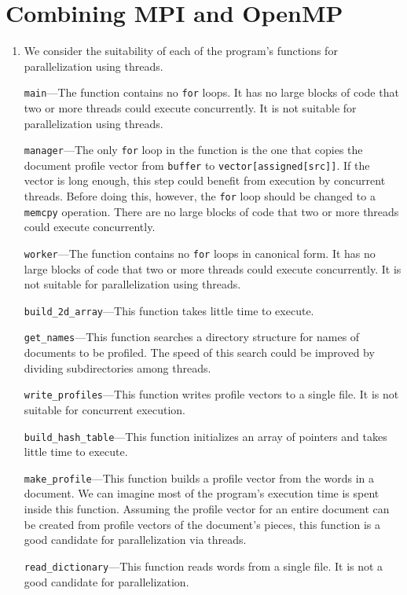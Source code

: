\chapter{Combining MPI and OpenMP}

\begin{enumerate}
\item 

We consider the suitability of each of the program's functions for
parallelization using threads.

{\tt main}---The function contains no {\tt for} loops.
It has no large blocks of code that
two or more threads could execute concurrently. It is not suitable for
parallelization using threads.

{\tt manager}---The only {\tt for} loop in the function is the one that
copies the document profile vector from {\tt buffer} to
{\tt vector[assigned[src]]}. If the vector is long enough, this step could
benefit from execution by concurrent threads. Before doing this,
however, the {\tt for} loop should be changed to a {\tt memcpy} operation.
There are no large blocks of code that two or more threads could execute
concurrently.

{\tt worker}---The function contains no {\tt for} loops in canonical form.
It has no large blocks of code that two or more threads could execute
concurrently. It is not suitable for parallelization using threads.

{\tt build\_2d\_array}---This function takes little time to execute.

{\tt get\_names}---This function searches a directory structure for names
of documents to be profiled. The speed of this search could be improved by
dividing subdirectories among threads.

{\tt write\_profiles}---This function writes profile vectors to a single
file. It is not suitable for concurrent execution.

{\tt build\_hash\_table}---This function initializes an array of pointers
and takes little time to execute.

{\tt make\_profile}---This function builds a profile vector from the words
in a document. We can imagine most of the program's execution time is spent
inside this function. Assuming the profile vector for an entire document can
be created from profile vectors of the document's pieces, this function is
a good candidate for parallelization via threads.

{\tt read\_dictionary}---This function reads words from a single file.
It is not a good candidate for parallelization.


\end{enumerate}
